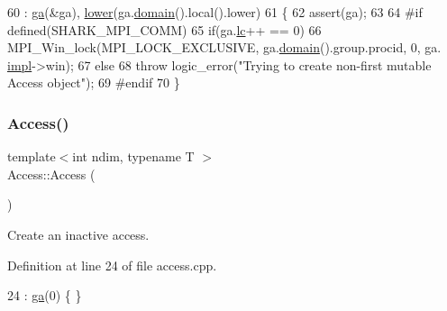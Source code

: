 \begin{DoxyCode}
60                                              : \hyperlink{classshark_1_1ndim_1_1_access_abc59e261a07fcecc3f1db641ef04efa7}{ga}(&ga), \hyperlink{classshark_1_1ndim_1_1_access_ac1e92dba307ff877963c94bd42fcbafb}{lower}(ga.\hyperlink{classshark_1_1ndim_1_1_global_array_a435ee8ff23c3feadf2ef2be64d4f375c}{domain}().local().lower)
61 \{
62     assert(ga);
63 
64 \textcolor{preprocessor}{    #if defined(SHARK\_MPI\_COMM)}
65         \textcolor{keywordflow}{if}(ga.\hyperlink{classshark_1_1ndim_1_1_global_array_a8248f4bd6e1f48d25148dd6d5288cb4c}{lc}++ == 0)
66             MPI\_Win\_lock(MPI\_LOCK\_EXCLUSIVE, ga.\hyperlink{classshark_1_1ndim_1_1_global_array_a435ee8ff23c3feadf2ef2be64d4f375c}{domain}().group.procid, 0, ga.
      \hyperlink{classshark_1_1ndim_1_1_global_array_a70684121da4badfef791c15d7076282f}{impl}->win);
67         \textcolor{keywordflow}{else}
68             \textcolor{keywordflow}{throw} logic\_error(\textcolor{stringliteral}{"Trying to create non-first mutable Access object"});
69 \textcolor{preprocessor}{    #endif}
70 \}
\end{DoxyCode}
\hypertarget{classshark_1_1ndim_1_1_access_a629b4a756aba5363d6172d01e4b8cb77}{}\label{classshark_1_1ndim_1_1_access_a629b4a756aba5363d6172d01e4b8cb77} 
\subsubsection{\texorpdfstring{Access()}{Access()}\hspace{0.1cm}{\footnotesize\ttfamily [3/5]}}
{\footnotesize\ttfamily template$<$int ndim, typename T $>$ \\
Access\+::\+Access (\begin{DoxyParamCaption}{ }\end{DoxyParamCaption})}

Create an inactive access. 

Definition at line 24 of file access.\+cpp.


\begin{DoxyCode}
24 : \hyperlink{classshark_1_1ndim_1_1_access_abc59e261a07fcecc3f1db641ef04efa7}{ga}(0) \{ \}
\end{DoxyCode}
\hypertarget{classshark_1_1ndim_1_1_access_a1d9ce46490a545c00c2327963428aa00}{}\label{classshark_1_1ndim_1_1_access_a1d9ce46490a545c00c2327963428aa00} 
